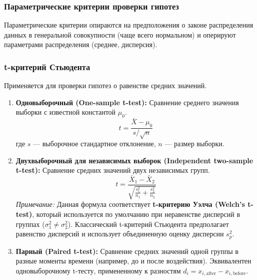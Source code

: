 \documentclass[12pt]{article}
\begin{document}
\subsubsection{Параметрические критерии проверки гипотез}

Параметрические критерии опираются на предположения о законе распределения данных в генеральной совокупности (чаще всего нормальном) и оперируют параметрами распределения (среднее, дисперсия).

\subsubsection{t-критерий Стьюдента}
Применяется для проверки гипотез о равенстве средних значений.

\begin{enumerate}
    \item \textbf{Одновыборочный (One-sample t-test):} Сравнение среднего значения выборки с известной константой $\mu_0$.
    \begin{equation}
        t = \frac{\bar{X} - \mu_0}{s / \sqrt{n}}
    \end{equation}
    где $s$ --- выборочное стандартное отклонение, $n$ --- размер выборки.
    
    \item \textbf{Двухвыборочный для независимых выборок (Independent two-sample t-test):} Сравнение средних значений двух независимых групп.
    \begin{equation}
        t = \frac{\bar{X}_1 - \bar{X}_2}{\sqrt{\frac{s_1^2}{n_1} + \frac{s_2^2}{n_2}}}
    \end{equation}
    \textit{Примечание:} Данная формула соответствует \textbf{t-критерию Уэлча (Welch's t-test)}, который используется по умолчанию при неравенстве дисперсий в группах ($\sigma_1^2 \neq \sigma_2^2$). Классический t-критерий Стьюдента предполагает равенство дисперсий и использует объединенную оценку дисперсии $s_p^2$.
    
    \item \textbf{Парный (Paired t-test):} Сравнение средних значений одной группы в разные моменты времени (например, до и после воздействия). Эквивалентен одновыборочному t-тесту, примененному к разностям $d_i = x_{i, \text{after}} - x_{i, \text{before}}$.
\end{enumerate}
\end{document}
